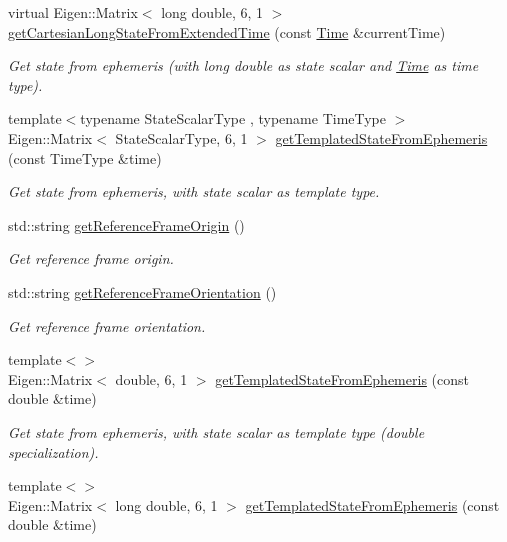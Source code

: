 \begin{DoxyCompactItemize}
virtual Eigen\+::\+Matrix$<$ long double, 6, 1 $>$ \hyperlink{classtudat_1_1ephemerides_1_1Ephemeris_a0dc15b6ec16fea02fa3af1a7ffbdeefe}{get\+Cartesian\+Long\+State\+From\+Extended\+Time} (const \hyperlink{classtudat_1_1Time}{Time} \&current\+Time)
\begin{DoxyCompactList}\small\item\em Get state from ephemeris (with long double as state scalar and \hyperlink{classtudat_1_1Time}{Time} as time type). \end{DoxyCompactList}\item 
{\footnotesize template$<$typename State\+Scalar\+Type , typename Time\+Type $>$ }\\Eigen\+::\+Matrix$<$ State\+Scalar\+Type, 6, 1 $>$ \hyperlink{classtudat_1_1ephemerides_1_1Ephemeris_aab6239fef97c6bc476ba7c0ea9c6e10b}{get\+Templated\+State\+From\+Ephemeris} (const Time\+Type \&time)
\begin{DoxyCompactList}\small\item\em Get state from ephemeris, with state scalar as template type. \end{DoxyCompactList}\item 
std\+::string \hyperlink{classtudat_1_1ephemerides_1_1Ephemeris_a6a81880bac3b4737ea522e232b40807b}{get\+Reference\+Frame\+Origin} ()
\begin{DoxyCompactList}\small\item\em Get reference frame origin. \end{DoxyCompactList}\item 
std\+::string \hyperlink{classtudat_1_1ephemerides_1_1Ephemeris_a9c03fe22d322ffecda1f60d91021f842}{get\+Reference\+Frame\+Orientation} ()
\begin{DoxyCompactList}\small\item\em Get reference frame orientation. \end{DoxyCompactList}\item 
{\footnotesize template$<$$>$ }\\Eigen\+::\+Matrix$<$ double, 6, 1 $>$ \hyperlink{classtudat_1_1ephemerides_1_1Ephemeris_a0ab52228c5e0e60253c4ad1c0e51d0fc}{get\+Templated\+State\+From\+Ephemeris} (const double \&time)\hypertarget{classtudat_1_1ephemerides_1_1Ephemeris_a0ab52228c5e0e60253c4ad1c0e51d0fc}{}\label{classtudat_1_1ephemerides_1_1Ephemeris_a0ab52228c5e0e60253c4ad1c0e51d0fc}

\begin{DoxyCompactList}\small\item\em Get state from ephemeris, with state scalar as template type (double specialization). \end{DoxyCompactList}\item 
{\footnotesize template$<$$>$ }\\Eigen\+::\+Matrix$<$ long double, 6, 1 $>$ \hyperlink{classtudat_1_1ephemerides_1_1Ephemeris_a74f968788b24caea12669f65f66b691a}{get\+Templated\+State\+From\+Ephemeris} (const double \&time)\hypertarget{classtudat_1_1ephemerides_1_1Ephemeris_a74f968788b24caea12669f65f66b691a}{}\label{classtudat_1_1ephemerides_1_1Ephemeris_a74f968788b24caea12669f65f66b691a}


\end{DoxyCompactItemize}
